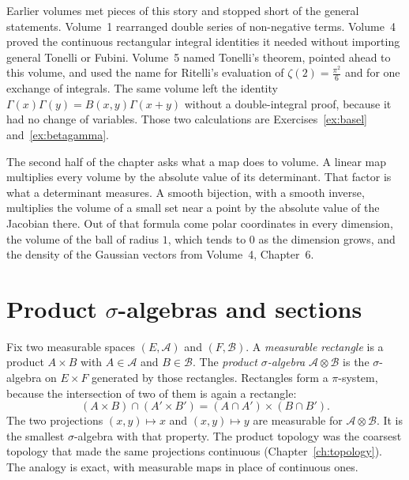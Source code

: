 Earlier volumes met pieces of this story and stopped short of the general statements. Volume~1 rearranged double series of non-negative terms. Volume~4 proved the continuous rectangular integral identities it needed without importing general Tonelli or Fubini. Volume~5 named Tonelli's theorem, pointed ahead to this volume, and used the name for Ritelli's evaluation of $\zeta(2)=\frac{\pi^2}6$ and for one exchange of integrals. The same volume left the identity $\Gamma(x)\Gamma(y)=B(x,y)\Gamma(x+y)$ without a double-integral proof, because it had no change of variables. Those two calculations are Exercises~\ref{ex:basel} and~\ref{ex:betagamma}.

The second half of the chapter asks what a map does to volume. A linear map multiplies every volume by the absolute value of its determinant. That factor is what a determinant measures. A smooth bijection, with a smooth inverse, multiplies the volume of a small set near a point by the absolute value of the Jacobian there. Out of that formula come polar coordinates in every dimension, the volume of the ball of radius $1$, which tends to $0$ as the dimension grows, and the density of the Gaussian vectors from Volume~4, Chapter~6.

\section{Product \texorpdfstring{$\sigma$}{sigma}-algebras and sections}

Fix two measurable spaces $(E,\mathcal A)$ and $(F,\mathcal B)$. A \emph{measurable rectangle} is a product $A\times B$ with $A\in\mathcal A$ and $B\in\mathcal B$. The \emph{product $\sigma$-algebra} $\mathcal A\otimes\mathcal B$ is the $\sigma$-algebra on $E\times F$ generated by those rectangles. Rectangles form a $\pi$-system, because the intersection of two of them is again a rectangle:
\[
(A\times B)\cap(A'\times B')=(A\cap A')\times(B\cap B').
\]
The two projections $(x,y)\mapsto x$ and $(x,y)\mapsto y$ are measurable for $\mathcal A\otimes\mathcal B$. It is the smallest $\sigma$-algebra with that property. The product topology was the coarsest topology that made the same projections continuous (Chapter~\ref{ch:topology}). The analogy is exact, with measurable maps in place of continuous ones.

